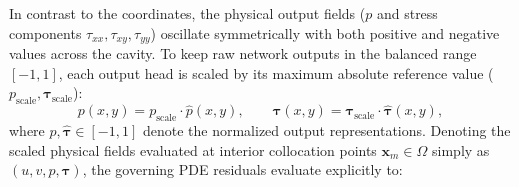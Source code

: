 In contrast to the coordinates, the physical output fields ($p$ and stress
components $\tau_{xx}, \tau_{xy}, \tau_{yy}$) oscillate symmetrically with both
positive and negative values across the cavity. To keep raw network outputs in
the balanced range $[-1, 1]$, each output head is scaled by its maximum absolute
reference value ($p_{\mathrm{scale}}, \boldsymbol{\tau}_{\mathrm{scale}}$):
\begin{equation}
    p(x, y) = p_{\mathrm{scale}} \cdot \hat{p}(x, y), \qquad \boldsymbol{\tau}(x, y) = \boldsymbol{\tau}_{\mathrm{scale}}
    \cdot \hat{\boldsymbol{\tau}}(x, y) ,
    \label{eq:output_scaling_vectors}
\end{equation}
where $\hat{p}, \hat{\boldsymbol{\tau}} \in [-1, 1]$ denote the normalized output representations.
Denoting the scaled physical fields evaluated at interior collocation points $\boldsymbol{x}_m \in \Omega$
simply as $(u, v, p, \boldsymbol{\tau})$, the governing PDE residuals evaluate explicitly to:
